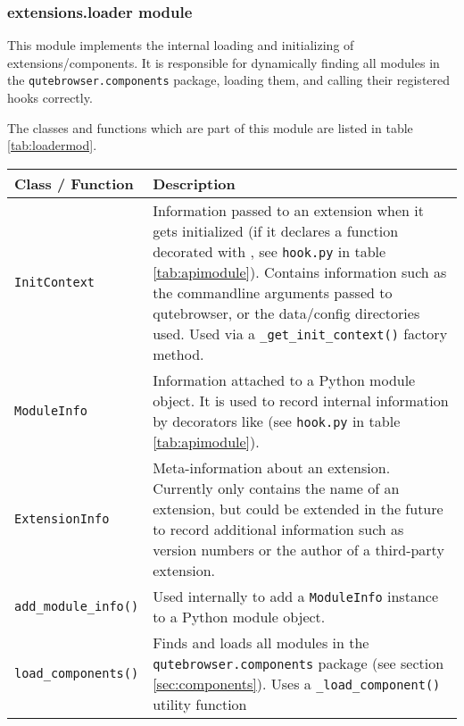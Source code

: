 \subsubsection{extensions.loader module}
This module implements the internal loading and initializing of
extensions/components. It is responsible for dynamically finding all modules
in the \verb|qutebrowser.components| package, loading them, and calling their
registered hooks correctly.

The classes and functions which are part of this module are listed in table
\ref{tab:loadermod}.

\begin{table}[p]
  \centering
  \begin{tabulary}{\linewidth}{lL}
    \toprule
    Class / Function & Description \\
    \midrule
    \verb|InitContext| & Information passed to an extension when it gets
                         initialized (if it declares a function decorated with
                         , see \verb|hook.py| in table
                         \ref{tab:apimodule}). Contains information such as the
                         commandline arguments passed to qutebrowser, or the
                         data/config directories used. Used via a
                         \verb|_get_init_context()| factory method.\\
    \verb|ModuleInfo| & Information attached to a Python module object. It is
                        used to record internal information by decorators like
                         (see \verb|hook.py| in table
                        \ref{tab:apimodule}). \\
    \verb|ExtensionInfo| & Meta-information about an extension. Currently only
                           contains the name of an extension, but could be
                           extended in the future to record additional
                           information such as version numbers or the author of
                           a third-party extension. \\
    \verb|add_module_info()| & Used internally to add a \verb|ModuleInfo|
                               instance to a Python module object. \\
    \verb|load_components()| & Finds and loads all modules in the
                               \verb|qutebrowser.components| package (see
                               section \ref{sec:components}). Uses a
                               \verb|_load_component()| utility function

\end{tabulary}
\end{table}
